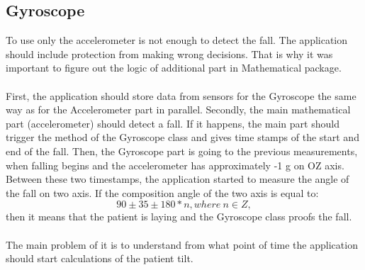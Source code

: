 \documentclass[conference,12pt]{IEEETran}
\begin{document}
\subsection{Gyroscope}
To use only the accelerometer is not enough to detect the fall. The application should include protection from making wrong decisions. That is why it was important to figure out the logic of additional part in Mathematical package.\\\\
First, the application should store data from sensors for the Gyroscope the same way as for the Accelerometer part in parallel. Secondly, the main mathematical part (accelerometer) should detect a fall. If it happens, the main part should trigger the method of the Gyroscope class and gives time stamps of the start and end of the fall. Then, the Gyroscope part is going to the previous measurements, when falling begins and the accelerometer has approximately -1 g on OZ axis. Between these two timestamps, the application started to measure the angle of the fall on two axis. If the composition angle of the two axis is equal to: $$90 \pm 35 \pm 180 * n, where\ n \in Z,$$
then it means that the patient is laying and the Gyroscope class proofs the fall.\\\\
The main problem of it is to understand from what point of time the application should start calculations of the patient tilt.
\end{document}
